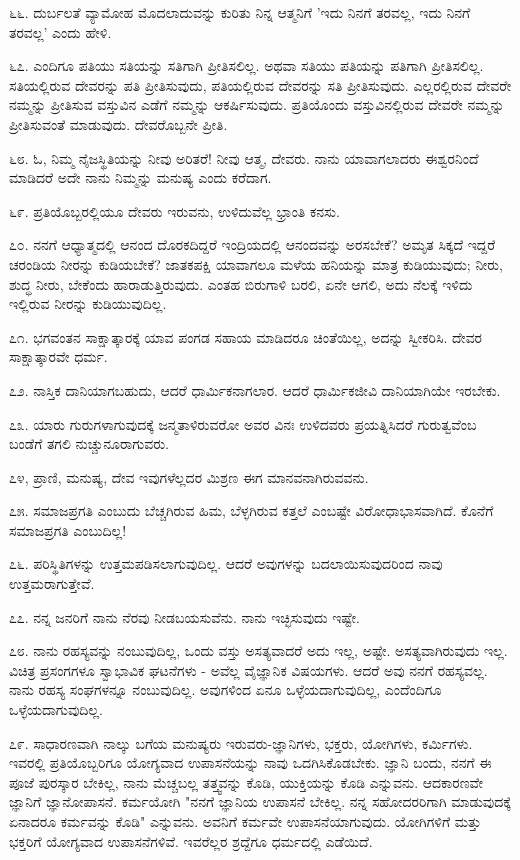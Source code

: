 ೬೬. ದುರ್ಬಲತೆ ವ್ಯಾಮೋಹ ಮೊದಲಾದುವನ್ನು ಕುರಿತು ನಿನ್ನ ಆತ್ಮನಿಗೆ 'ಇದು ನಿನಗೆ ತರವಲ್ಲ, ಇದು ನಿನಗೆ ತರವಲ್ಲ' ಎಂದು ಹೇಳಿ.

೬೭. ಎಂದಿಗೂ ಪತಿಯು ಸತಿಯನ್ನು ಸತಿಗಾಗಿ ಪ್ರೀತಿಸಲಿಲ್ಲ. ಅಥವಾ ಸತಿಯು ಪತಿಯನ್ನು ಪತಿಗಾಗಿ ಪ್ರೀತಿಸಲಿಲ್ಲ. ಸತಿಯಲ್ಲಿರುವ ದೇವರನ್ನು ಪತಿ ಪ್ರೀತಿಸುವುದು, ಪತಿಯಲ್ಲಿರುವ ದೇವರನ್ನು ಸತಿ ಪ್ರೀತಿಸುವುದು. ಎಲ್ಲರಲ್ಲಿರುವ ದೇವರೇ ನಮ್ಮನ್ನು ಪ್ರೀತಿಸುವ ವಸ್ತುವಿನ ಎಡೆಗೆ ನಮ್ಮನ್ನು ಆಕರ್ಷಿಸುವುದು. ಪ್ರತಿಯೊಂದು ವಸ್ತುವಿನಲ್ಲಿರುವ ದೇವರೇ ನಮ್ಮನ್ನು ಪ್ರೀತಿಸುವಂತೆ ಮಾಡುವುದು. ದೇವರೊಬ್ಬನೇ ಪ್ರೀತಿ.

೬೮. ಓ, ನಿಮ್ಮ ನೈಜಸ್ಥಿತಿಯನ್ನು ನೀವು ಅರಿತರೆ! ನೀವು ಆತ್ಮ, ದೇವರು. ನಾನು ಯಾವಾಗಲಾದರು ಈಶ್ವರನಿಂದೆ ಮಾಡಿದರೆ ಅದೇ ನಾನು ನಿಮ್ಮನ್ನು ಮನುಷ್ಯ ಎಂದು ಕರೆದಾಗ.

೬೯. ಪ್ರತಿಯೊಬ್ಬರಲ್ಲಿಯೂ ದೇವರು ಇರುವನು, ಉಳಿದುವೆಲ್ಲ ಭ್ರಾಂತಿ ಕನಸು.

೭೦. ನನಗೆ ಆಧ್ಯಾತ್ಮದಲ್ಲಿ ಆನಂದ ದೊರಕದಿದ್ದರೆ ಇಂದ್ರಿಯದಲ್ಲಿ ಆನಂದವನ್ನು ಅರಸಬೇಕೆ? ಅಮೃತ ಸಿಕ್ಕದೆ ಇದ್ದರೆ ಚರಂಡಿಯ ನೀರನ್ನು ಕುಡಿಯಬೇಕೆ? ಜಾತಕಪಕ್ಷಿ ಯಾವಾಗಲೂ ಮಳೆಯ ಹನಿಯನ್ನು ಮಾತ್ರ ಕುಡಿಯುವುದು; ನೀರು, ಶುದ್ಧ ನೀರು, ಬೇಕೆಂದು ಹಾರಾಡುತ್ತಿರುವುದು. ಎಂತಹ ಬಿರುಗಾಳಿ ಬರಲಿ, ಏನೇ ಆಗಲಿ, ಅದು ನೆಲಕ್ಕೆ ಇಳಿದು ಇಲ್ಲಿರುವ ನೀರನ್ನು ಕುಡಿಯುವುದಿಲ್ಲ.

೭೧. ಭಗವಂತನ ಸಾಕ್ಷಾತ್ಕಾರಕ್ಕೆ ಯಾವ ಪಂಗಡ ಸಹಾಯ ಮಾಡಿದರೂ ಚಿಂತೆಯಿಲ್ಲ, ಅದನ್ನು ಸ್ವೀಕರಿಸಿ. ದೇವರ ಸಾಕ್ಷಾತ್ಕಾರವೇ ಧರ್ಮ.

೭೨. ನಾಸ್ತಿಕ ದಾನಿಯಾಗಬಹುದು, ಆದರೆ ಧಾರ್ಮಿಕನಾಗಲಾರ. ಆದರೆ ಧಾರ್ಮಿಕಜೀವಿ ದಾನಿಯಾಗಿಯೇ ಇರಬೇಕು.

೭೩. ಯಾರು ಗುರುಗಳಾಗುವುದಕ್ಕೆ ಜನ್ಮತಾಳಿರುವರೋ ಅವರ ವಿನಃ ಉಳಿದವರು ಪ್ರಯತ್ನಿಸಿದರೆ ಗುರುತ್ವವೆಂಬ ಬಂಡೆಗೆ ತಗಲಿ ನುಚ್ಚುನೂರಾಗುವರು.

೭೪, ಪ್ರಾಣಿ, ಮನುಷ್ಯ, ದೇವ ಇವುಗಳೆಲ್ಲದರ ಮಿಶ್ರಣ ಈಗ ಮಾನವನಾಗಿರುವವನು.

೭೫. ಸಮಾಜಪ್ರಗತಿ ಎಂಬುದು ಬೆಚ್ಚಗಿರುವ ಹಿಮ, ಬೆಳ್ಳಗಿರುವ ಕತ್ತಲೆ ಎಂಬಷ್ಟೇ ವಿರೋಧಾಭಾಸವಾಗಿದೆ. ಕೊನೆಗೆ ಸಮಾಜಪ್ರಗತಿ ಎಂಬುದಿಲ್ಲ!

೭೬. ಪರಿಸ್ಥಿತಿಗಳನ್ನು ಉತ್ತಮಪಡಿಸಲಾಗುವುದಿಲ್ಲ. ಆದರೆ ಅವುಗಳನ್ನು ಬದಲಾಯಿಸುವುದರಿಂದ ನಾವು ಉತ್ತಮರಾಗುತ್ತೇವೆ.

೭೭. ನನ್ನ ಜನರಿಗೆ ನಾನು ನೆರವು ನೀಡಬಯಸುವೆನು. ನಾನು ಇಚ್ಛಿಸುವುದು ಇಷ್ಟೇ.

೭೮. ನಾನು ರಹಸ್ಯವನ್ನು ನಂಬುವುದಿಲ್ಲ, ಒಂದು ವಸ್ತು ಅಸತ್ಯವಾದರೆ ಅದು ಇಲ್ಲ, ಅಷ್ಟೇ. ಅಸತ್ಯವಾಗಿರುವುದು ಇಲ್ಲ. ವಿಚಿತ್ರ ಪ್ರಸಂಗಗಳೂ ಸ್ವಾಭಾವಿಕ ಘಟನೆಗಳು - ಅವೆಲ್ಲ ವೈಜ್ಞಾನಿಕ ವಿಷಯಗಳು. ಆದರೆ ಅವು ನನಗೆ ರಹಸ್ಯವಲ್ಲ. ನಾನು ರಹಸ್ಯ ಸಂಘಗಳನ್ನೂ ನಂಬುವುದಿಲ್ಲ. ಅವುಗಳಿಂದ ಏನೂ ಒಳ್ಳೆಯದಾಗುವುದಿಲ್ಲ, ಎಂದೆಂದಿಗೂ ಒಳ್ಳೆಯದಾಗುವುದಿಲ್ಲ.

೭೯. ಸಾಧಾರಣವಾಗಿ ನಾಲ್ಕು ಬಗೆಯ ಮನುಷ್ಯರು ಇರುವರು-ಜ್ಞಾನಿಗಳು, ಭಕ್ತರು, ಯೋಗಿಗಳು, ಕರ್ಮಿಗಳು. ಇವರಲ್ಲಿ ಪ್ರತಿಯೊಬ್ಬರಿಗೂ ಯೋಗ್ಯವಾದ ಉಪಾಸನೆಯನ್ನು ನಾವು ಒದಗಿಸಿಕೊಡಬೇಕು. ಜ್ಞಾನಿ ಬಂದು, ನನಗೆ ಈ ಪೂಜೆ ಪುರಸ್ಕಾರ ಬೇಕಿಲ್ಲ, ನಾನು ಮೆಚ್ಚಬಲ್ಲ ತತ್ತ್ವವನ್ನು ಕೊಡಿ, ಯುಕ್ತಿಯನ್ನು ಕೊಡಿ ಎನ್ನುವನು. ಆದಕಾರಣವೇ ಜ್ಞಾನಿಗೆ ಜ್ಞಾನೋಪಾಸನೆ. ಕರ್ಮಯೋಗಿ "ನನಗೆ ಜ್ಞಾನಿಯ ಉಪಾಸನೆ ಬೇಕಿಲ್ಲ. ನನ್ನ ಸಹೋದರರಿಗಾಗಿ ಮಾಡುವುದಕ್ಕೆ ಏನಾದರೂ ಕರ್ಮವನ್ನು ಕೊಡಿ" ಎನ್ನುವನು. ಅವನಿಗೆ ಕರ್ಮವೇ ಉಪಾಸನೆಯಾಗುವುದು. ಯೋಗಿಗಳಿಗೆ ಮತ್ತು ಭಕ್ತರಿಗೆ ಯೋಗ್ಯವಾದ ಉಪಾಸನೆಗಳಿವೆ. ಇವರೆಲ್ಲರ ಶ್ರದ್ದೆಗೂ ಧರ್ಮದಲ್ಲಿ ಎಡೆಯಿದೆ.

